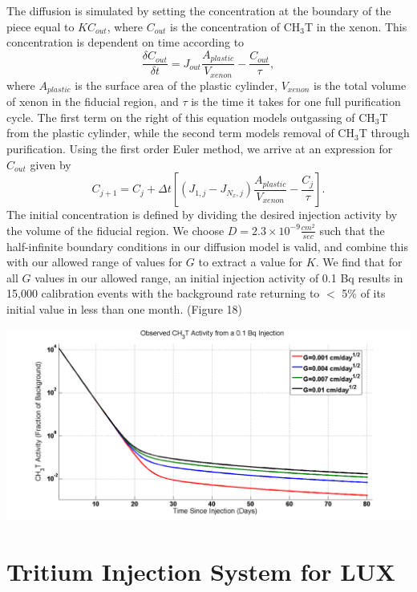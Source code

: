 \documentclass[a4paper,12pt]{article}
\begin{document}
The diffusion is simulated by setting the concentration at the boundary of the piece equal to $KC_{out}$, where $C_{out}$ is the concentration of CH$_3$T in the xenon.  This concentration is dependent on time according to
\[\frac{\delta C_{out}}{\delta t} = J_{out} \frac{A_{plastic}}{V_{xenon}}-\frac{C_{out}}{\tau},\]
where $A_{plastic}$ is the surface area of the plastic cylinder, $V_{xenon}$ is the total volume of xenon in the fiducial region, and $\tau$ is the time it takes for one full purification cycle.  The first term on the right of this equation models outgassing of CH$_3$T from the plastic cylinder, while the second term models removal of CH$_3$T through purification.  Using the first order Euler method, we arrive at an expression for $C_{out}$ given by
\[C_{j+1}=C_j + \Delta t [(J_{1,j}-J_{N_x,j})\frac{A_{plastic}}{V_{xenon}}-\frac{C_j}{\tau}].\]
The initial concentration is defined by dividing the desired injection activity by the volume of the fiducial region.  We choose $D = 2.3 \times 10^{-9} \frac {cm^2}{sec}$ such that the half-infinite boundary conditions in our diffusion model is valid, and combine this with our allowed range of values for $G$ to extract a value for $K$.  We find that for all $G$ values in our allowed range, an initial injection activity of 0.1 Bq results in 15,000 calibration events with the background rate returning to $<$ 5\% of its initial value in less than one month. (Figure 18)

\begin{center}
\includegraphics[scale=0.3]{LUXActivityOverTime.png}
\end{center}

\section{Tritium Injection System for LUX}
\end{document}
